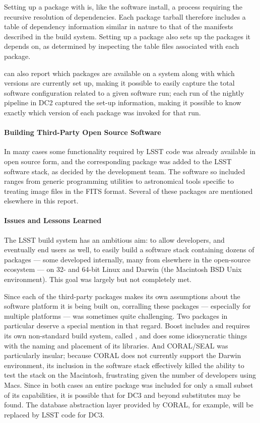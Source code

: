 Setting up a package with  is, like the software install, a process
requiring the recursive resolution of dependencies. Each package tarball
therefore includes a table of dependency information similar in nature to that
of the manifests described in the build system. Setting up a package also sets
up the packages it depends on, as determined by inspecting the  table
files associated with each package.

 can also report which packages are available on a system along with
which versions are currently set up, making it possible to easily capture the
total software configuration related to a given software run; each run of the
nightly pipeline in DC2 captured the  set-up information, making it
possible to know exactly which version of each package was invoked for that run.

\paragraph{Building Third-Party Open Source Software} In many cases some
functionality required by LSST code was already available in open source form,
and the corresponding package was added to the LSST software stack, as decided
by the development team. The software so included ranges from generic
programming utilities to astronomical tools specific to treating image files in
the FITS format. Several of these packages are mentioned elsewhere in this report.

\paragraph{Issues and Lessons Learned}

The LSST build system has an ambitious aim: to allow developers, and eventually
end users as well, to easily build a software stack containing dozens of
packages --- some developed internally, many from elsewhere in the open-source
ecosystem --- on 32- and 64-bit Linux and Darwin (the Macintosh BSD Unix
environment). This goal was largely but not completely met.

Since each of the third-party packages makes its own assumptions about the
software platform it is being built on, corralling these packages --- especially
for multiple platforms --- was sometimes quite challenging. Two packages in
particular deserve a special mention in that regard. Boost includes and requires
its own non-standard build system, called , and does some
idiosyncratic things with the naming and placement of its libraries. And
CORAL/SEAL was particularly insular; because CORAL does not currently support
the Darwin environment, its inclusion in the software stack effectively killed
the ability to test the stack on the Macintosh, frustrating given the number of
developers using Macs. Since in both cases an entire package was included for
only a small subset of its capabilities, it is possible that for DC3 and beyond
substitutes may be found. The database abstraction layer provided by CORAL, for
example, will be replaced by LSST code for DC3.

